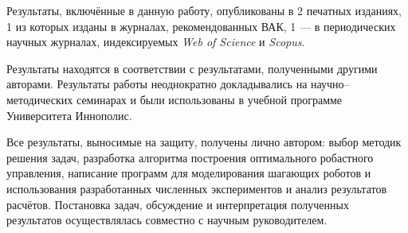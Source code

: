 {\reliability} 
Результаты, включённые в данную работу, опубликованы в 2 печатных изданиях, 1 из которых изданы в журналах, рекомендованных ВАК, 1 --- в периодических научных журналах, индексируемых \textit{Web of Science} и \textit{Scopus}. 

Результаты находятся в соответствии с результатами, полученными другими авторами. Результаты работы неоднократно докладывались на научно--методических семинарах и были использованы в учебной программе Университета Иннополис.

{\contribution} 

Все результаты, выносимые на защиту, получены лично автором: выбор методик решения задач, разработка алгоритма построения оптимального робастного управления, написание программ для моделирования шагающих роботов и использования разработанных численных экспериментов и анализ результатов расчётов. Постановка задач, обсуждение и интерпретация полученных результатов осуществлялась совместно с научным руководителем.